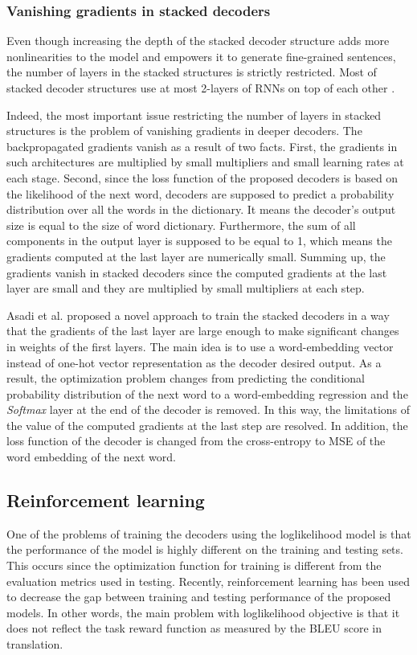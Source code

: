 \documentclass[preprint, 12pt]{elsarticle}
\begin{document}
		\subsubsection{Vanishing gradients in stacked decoders}
		Even though increasing the depth of the stacked decoder structure adds more nonlinearities to the model and empowers it to generate fine-grained sentences, the number of layers in the stacked structures is strictly restricted. Most of stacked decoder structures use at most 2-layers of RNNs on top of each other \cite{donahue2015long} \cite{pan2016hierarchical} \cite{yu2016video}. 
		
		Indeed, the most important issue restricting the number of layers in stacked structures is the problem of vanishing gradients in deeper decoders. The backpropagated gradients vanish as a result of two facts. First, the gradients in such architectures are multiplied by small multipliers and small learning rates at each stage. Second, since the loss function of the proposed decoders is based on the likelihood of the next word, decoders are supposed to predict a probability distribution over all the words in the dictionary. It means the decoder's output size is equal to the size of word dictionary. Furthermore, the sum of all components in the output layer is supposed to be equal to 1, which means the gradients computed at the last layer are numerically small. Summing up, the gradients vanish in stacked decoders since the computed gradients at the last layer are small and they are multiplied by small multipliers at each step.
		
		Asadi et al. \cite{Asadi2019stacked} proposed a novel approach to train the stacked decoders in a way that the gradients of the last layer are large enough to make significant changes in weights of the first layers. The main idea is to use a word-embedding vector instead of one-hot vector representation as the decoder desired output. As a result, the optimization problem changes from predicting the conditional probability distribution of the next word to a word-embedding regression and the \textit{Softmax} layer at the end of the decoder is removed. In this way, the limitations of the value of the computed gradients at the last step are resolved. In addition, the loss function of the decoder is changed from the cross-entropy to MSE of the word embedding of the next word.
		
		\subsection{Reinforcement learning}
		One of the problems of training the decoders using the loglikelihood model is that the performance of the model is highly different on the training and testing sets. This occurs since the optimization function for training is different from the evaluation metrics used in testing. Recently, reinforcement learning has been used to decrease the gap between training and testing performance of the proposed models. In other words, the main problem with loglikelihood objective is that it does not reflect the task reward function as measured by the BLEU score in translation. 
		
\end{document}
